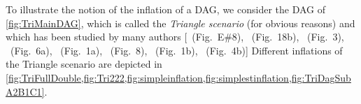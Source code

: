 To illustrate the notion of the inflation of a DAG, we consider the DAG of \cref{fig:TriMainDAG}, which is called the {\em Triangle scenario} (for obvious reasons) and which has been studied by many authors [\citealp{pusey2014gdag}~(Fig.~E\#8), \citealp{WoodSpekkens}~(Fig.~18b), \citealp{fritz2012bell}~(Fig.~3), \citealp{chaves2014novel}~(Fig.~6a), \citealp{Chaves2015infoquantum}~(Fig.~1a), \citealp{BilocalCorrelations}~(Fig.~8), \citealp{steudel2010ancestors}~(Fig.~1b), \citealp{chaves2014informationinference}~(Fig.~4b)]
Different inflations of the Triangle scenario are depicted in \cref{fig:TriFullDouble,fig:Tri222,fig:simpleinflation,fig:simplestinflation,fig:TriDagSubA2B1C1}.

